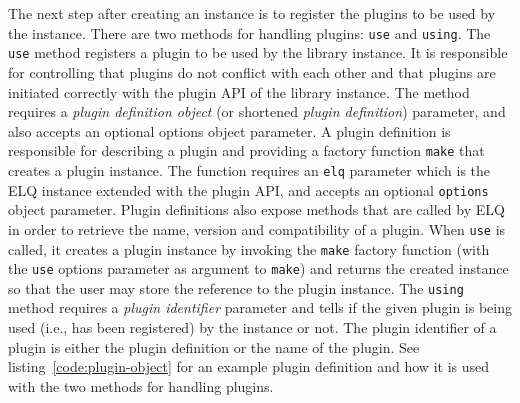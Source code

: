 \documentclass[a4paper,11pt]{kth-mag}
\newcommand{\code}[1]{\texttt{#1}}
\begin{document}
        The next step after creating an instance is to register the plugins to be used by the instance.
        There are two methods for handling plugins: \code{use} and \code{using}.
        The \code{use} method registers a plugin to be used by the library instance.
        It is responsible for controlling that plugins do not conflict with each other and that plugins are initiated correctly with the plugin \gls{API} of the library instance.
        The method requires a \emph{plugin definition object} (or shortened \emph{plugin definition}) parameter, and also accepts an optional options object parameter.
        A plugin definition is responsible for describing a plugin and providing a factory function \code{make} that creates a plugin instance.
        The function requires an \code{elq} parameter which is the \gls{ELQ} instance extended with the plugin \gls{API}, and accepts an optional \code{options} object parameter.
        Plugin definitions also expose methods that are called by \gls{ELQ} in order to retrieve the name, version and compatibility of a plugin.
        When \code{use} is called, it creates a plugin instance by invoking the \code{make} factory function (with the \code{use} options parameter as argument to \code{make}) and returns the created instance so that the user may store the reference to the plugin instance.
        The \code{using} method requires a \emph{plugin identifier} parameter and tells if the given plugin is being used (i.e., has been registered) by the instance or not.
        The plugin identifier of a plugin is either the plugin definition or the name of the plugin.
        See listing~\ref{code:plugin-object} for an example plugin definition and how it is used with the two methods for handling plugins.
\end{document}
